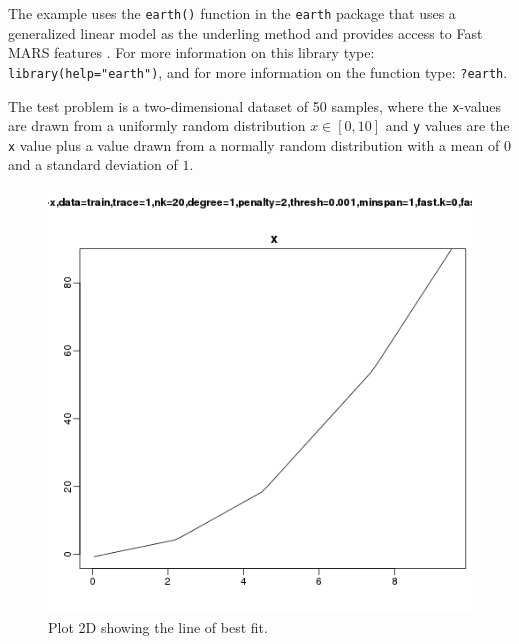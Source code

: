 The example uses the \texttt{earth()} function in the \texttt{earth} package that uses a generalized linear model as the underling method and provides access to Fast MARS features \cite{Milborrow2012}. For more information on this library type: \texttt{library(help="earth")}, and for more information on the function type: \texttt{?earth}.

The test problem is a two-dimensional dataset of 50 samples, where the \texttt{x}-values are drawn from a uniformly random distribution $x \in [0,10]$ and \texttt{y} values are the \texttt{x} value plus a value drawn from a normally random distribution with a mean of $0$ and a standard deviation of $1$.



\begin{figure}[htp]
\centering
\includegraphics[scale=0.45]{book/a_regression/multivariate_adaptive_regression_splines_result.png}
\caption{Plot 2D showing the line of best fit.}
\label{plot:multivariate_adaptive_regression_splines_result}
\end{figure}

